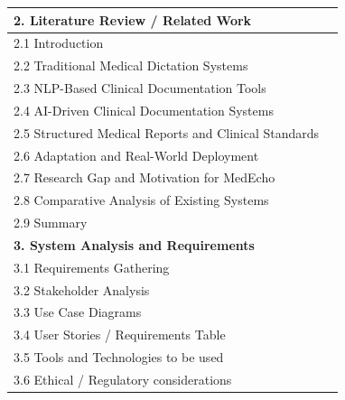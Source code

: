 \begin{longtable}{|p{13cm}|c|}
\textbf{2. Literature Review / Related Work} & \pageref{chapter:literature} \\ \hline
\hspace{0.6cm}2.1 Introduction & \pageref{sec:lit:summary} \\ \hline
\hspace{0.6cm}2.2 Traditional Medical Dictation Systems & \pageref{sec:lit:dictation} \\ \hline
\hspace{0.6cm}2.3 NLP-Based Clinical Documentation Tools & \pageref{sec:lit:nlp} \\ \hline
\hspace{0.6cm}2.4 AI-Driven Clinical Documentation Systems & \pageref{sec:lit:ai} \\ \hline
\hspace{0.6cm}2.5 Structured Medical Reports and Clinical Standards & \pageref{sec:lit:structure} \\ \hline
\hspace{0.6cm}2.6 Adaptation and Real-World Deployment & \pageref{sec:lit:adaptation} \\ \hline
\hspace{0.6cm}2.7 Research Gap and Motivation for MedEcho & \pageref{sec:lit:gap} \\ \hline
\hspace{0.6cm}2.8 Comparative Analysis of Existing Systems & \pageref{tab:lit-comparison} \\ \hline
\hspace{0.6cm}2.9 Summary & \pageref{sec:lit:summary} \\ \hline


\textbf{3. System Analysis and Requirements} & \pageref{chapter:analysis} \\ \hline
\hspace{0.6cm}3.1 Requirements Gathering & \pageref{sec:analysis:reqs} \\ \hline
\hspace{0.6cm}3.2 Stakeholder Analysis & \pageref{sec:analysis:analysis} \\ \hline
\hspace{0.6cm}3.3 Use Case Diagrams & \pageref{sec:analysis:usecases} \\ \hline
\hspace{0.6cm}3.4 User Stories / Requirements Table & \pageref{sec:analysis:stories} \\ \hline
\hspace{0.6cm}3.5 Tools and Technologies to be used & \pageref{sec:analysis:tools} \\ \hline
\hspace{0.6cm}3.6 Ethical / Regulatory considerations & \pageref{sec:analysis:ethics} \\ \hline


\end{longtable}
